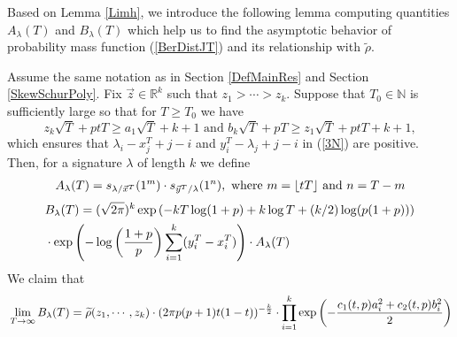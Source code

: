 Based on Lemma \ref{Limh}, we introduce the following lemma computing quantities $A_\lambda(T)$ and $B_{\lambda}(T)$ which help us to find the asymptotic behavior of probability mass function (\ref{BerDistJT}) and its relationship with $\widetilde{\rho}$.
\begin{lemma}{\label{ALambdaBLambda}}
	Assume the same notation as in Section \ref{DefMainRes} and Section \ref{SkewSchurPoly}. Fix $\vec{z}\in\mathbb{R}^{k}$ such that $z_1>\cdots>z_k$. Suppose that $T_{0}\in\mathbb{N}$ is sufficiently large so that for $T\geq T_{0}$ we have
$$z_{k}\sqrt{T}+ptT\geq a_1\sqrt{T}+k+1 \text{ and } b_{k}\sqrt{T}+pT\geq z_{1}\sqrt{T}+ptT+k+1,$$ which ensures that $\lambda_{i}-x^{T}_{j}+j-i$ and $y^{T}_{i}-\lambda_{j}+j-i$ in (\ref{3N}) are positive. Then, for a signature $\lambda$ of length $k$ we define
\begin{align}{\label{DefALambda}}
	A_{\lambda}(T)=s_{\lambda/\vec{x}^T}(1^{m})\cdot s_{\vec{y}^T/\lambda}(1^{n}),\text{ where } m=\lfloor tT \rfloor \text{ and } n=T-m
\end{align} 
\begin{align}{\label{DefBLambda}}
\begin{split}
	& B_{\lambda}(T)=(\sqrt{2\pi})^{k}\exp\left(-kT\log(1+p)+k\log T +(k/2)\log(p(1+p))\right)\\
	& \cdot \exp\left(-\log\left(\frac{1+p}{p}\right)\sum_{i=1}^{k}(y_{i}^{T}-x_{i}^{T})\right)\cdot A_{\lambda}(T)
\end{split}
\end{align}
We claim that
\begin{align}{\label{BLambda}}
	\lim_{T\rightarrow\infty} B_{\lambda}(T)=\widetilde{\rho}(z_1,\cdots,z_k)\cdot (2\pi p(p+1)t(1-t))^{-\frac{k}{2}}\cdot\prod_{i=1}^{k}\exp\left(-\frac{c_1(t,p)a_i^{2}+c_2(t,p)b_i^2}{2}\right)
\end{align}
\end{lemma}
